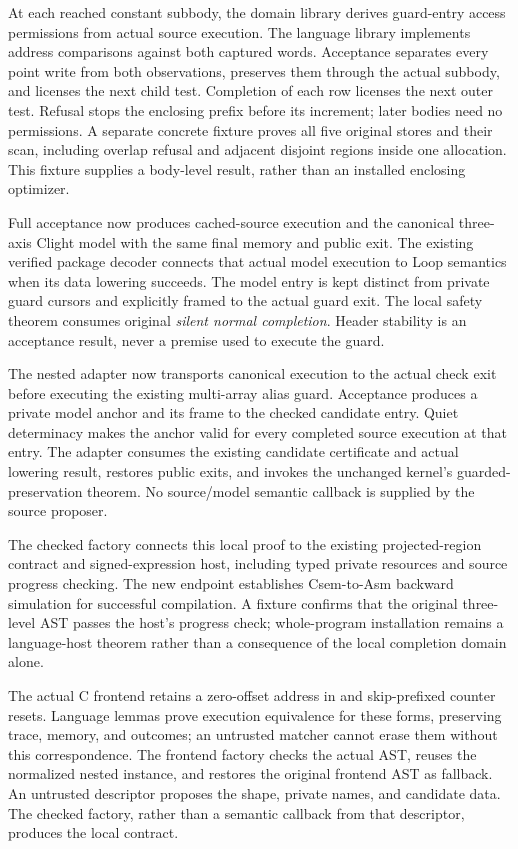 At each reached constant subbody, the domain library derives guard-entry access
permissions from actual source execution. The language library implements
address comparisons against both captured words. Acceptance separates every
point write from both observations, preserves them through the actual subbody,
and licenses the next child test. Completion of each row licenses the next
outer test. Refusal stops the enclosing prefix before its increment; later
bodies need no permissions. A separate concrete fixture proves all five original
stores and their scan, including overlap refusal and adjacent disjoint regions
inside one allocation. This fixture supplies a body-level result, rather than
an installed enclosing optimizer.

Full acceptance now produces cached-source execution and the canonical
three-axis Clight model with the same final memory and public exit. The existing
verified package decoder connects that actual model execution to Loop semantics
when its data lowering succeeds. The model entry is kept distinct from private
guard cursors and explicitly framed to the actual guard exit. The local safety
theorem consumes original \emph{silent normal completion}. Header stability is an
acceptance result, never a premise used to execute the guard.

The nested adapter now transports canonical execution to the actual check exit
before executing the existing multi-array alias guard. Acceptance produces a
private model anchor and its frame to the checked candidate entry. Quiet
determinacy makes the anchor valid for every completed source execution at that
entry. The adapter consumes the existing candidate certificate and actual
lowering result, restores public exits, and invokes the unchanged kernel's
guarded-preservation theorem. No source/model semantic callback is supplied by
the source proposer.

The checked factory connects this local proof to the existing projected-region
contract and signed-expression host, including typed private resources and
source progress checking. The new 
endpoint establishes Csem-to-Asm backward simulation for successful compilation.
A fixture confirms that the original three-level AST passes the host's progress
check; whole-program installation remains a language-host theorem rather than
a consequence of the local completion domain alone.

The actual C frontend retains a zero-offset address in  and
skip-prefixed counter resets. Language lemmas prove execution equivalence for
these forms, preserving trace, memory, and outcomes; an untrusted matcher cannot
erase them without this correspondence. The frontend factory checks the actual
AST, reuses the normalized nested instance, and restores the original frontend
AST as fallback. An untrusted descriptor proposes the shape, private names, and
candidate data. The checked factory, rather than a semantic callback from that
descriptor, produces the local contract.

